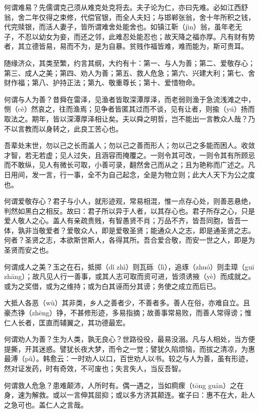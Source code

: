 \documentclass[12pt,UTF8]{ctexbook}
\begin{document}
何谓难易？先儒谓克己须从难克处克将去。夫子论为仁，亦曰先难。必如江西舒翁，舍二年仅得之束修，代偿官银，而全人夫妇；与邯郸张翁，舍十年所积之钱，代完赎银，而活人妻子，皆所谓难舍处能舍也。如镇江靳（jìn）翁，虽年老无子，不忍以幼女为妾，而还之邻，此难忍处能忍也；故天降之福亦厚。凡有财有势者，其立德皆易，易而不为，是为自暴。贫贱作福皆难，难而能为，斯可贵耳。

随缘济众，其类至繁，约言其纲，大约有十：第一、与人为善；第二、爱敬存心；第三、成人之美；第四、劝人为善；第五、救人危急；第六、兴建大利；第七、舍财作福；第八、护持正法；第九、敬重尊长；第十、爱惜物命。

何谓与人为善？昔舜在雷泽，见渔者皆取深潭厚泽，而老弱则渔于急流浅滩之中，恻（cè）然哀之，往而渔焉；见争者皆匿其过而不谈，见有让者，则揄（yú）扬而取法之。期年，皆以深潭厚泽相让矣。夫以舜之明哲，岂不能出一言教众人哉？乃不以言教而以身转之，此良工苦心也。

吾辈处末世，勿以己之长而盖人；勿以己之善而形人；勿以己之多能而困人。收敛才智，若无若虚；见人过失，且涵容而掩覆之。一则令其可改，一则令其有所顾忌而不敢纵，见人有微长可取，小善可录，翻然舍己而从之；且为艳称而广述之。凡日用间，发一言，行一事，全不为自己起念，全是为物立则；此大人天下为公之度也。

何谓爱敬存心？君子与小人，就形迹观，常易相混，惟一点存心处，则善恶悬绝，判然如黑白之相反。故曰：君子所以异于人者，以其存心也。君子所存之心，只是爱人敬人之心。盖人有亲疏贵贱，有智愚贤不肖；万品不齐，皆吾同胞，皆吾一体，孰非当敬爱者？爱敬众人，即是爱敬圣贤；能通众人之志，即是通圣贤之志。何者？圣贤之志，本欲斯世斯人，各得其所。吾合爱合敬，而安一世之人，即是为圣贤而安之也。

何谓成人之美？玉之在石，抵掷（dǐ zhì）则瓦砾（lì），追琢（zhuó）则圭璋（guī zhāng）；故凡见人行一善事，或其人志可取而资可进，皆须诱掖（yè）而成就之。或为之奖借，或为之维持；或为白其诬而分其谤；务使之成立而后已。

大抵人各恶（wù）其非类，乡人之善者少，不善者多。善人在俗，亦难自立。且豪杰铮（zhēng）铮，不甚修形迹，多易指摘；故善事常易败，而善人常得谤；惟仁人长者，匡直而辅翼之，其功德最宏。

何谓劝人为善？生为人类，孰无良心？世路役役，最易没溺。凡与人相处，当方便提撕，开其迷惑。譬犹长夜大梦，而令之一觉；譬犹久陷烦恼，而拔之清凉，为惠最溥（pǔ）。韩愈云：一时劝人以口，百世劝人以书。较之与人为善，虽有形迹，然对证发药，时有奇效，不可废也；失言失人，当反吾智。

何谓救人危急？患难颠沛，人所时有。偶一遇之，当如痌瘝（tōng  guān）之在身，速为解救。或以一言伸其屈抑；或以多方济其颠连。崔子曰：惠不在大，赴人之急可也。盖仁人之言哉。
\end{document}
